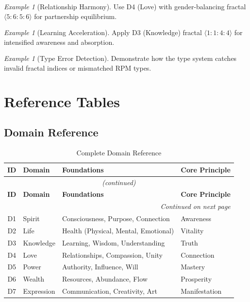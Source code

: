 \documentclass[11pt,twoside,openright]{book}
\theoremstyle{definition}
\theoremstyle{plain}
\theoremstyle{remark}
\newtheorem{example}[definition]{Example}
\begin{document}
\begin{example}[Relationship Harmony]
\label{ex:relationship}
Use D4 (Love) with gender-balancing fractal $\langle 5:6:5:6 \rangle$ for partnership equilibrium.
\end{example}

\begin{example}[Learning Acceleration]
\label{ex:learning}
Apply D3 (Knowledge) fractal $\langle 1:1:4:4 \rangle$ for intensified awareness and absorption.
\end{example}

\begin{example}[Type Error Detection]
\label{ex:type-error}
Demonstrate how the type system catches invalid fractal indices or mismatched RPM types.
\end{example}

\chapter{Reference Tables}
\label{ch:reference}

\section{Domain Reference}

\begin{center}
\begin{longtable}{clll}
\caption{Complete Domain Reference} \\
\toprule
\textbf{ID} & \textbf{Domain} & \textbf{Foundations} & \textbf{Core Principle} \\
\midrule
\endfirsthead
\multicolumn{4}{c}{\textit{(continued)}} \\
\toprule
\textbf{ID} & \textbf{Domain} & \textbf{Foundations} & \textbf{Core Principle} \\
\midrule
\endhead
\midrule
\multicolumn{4}{r}{\textit{Continued on next page}} \\
\endfoot
\bottomrule
\endlastfoot
D1 & Spirit & Consciousness, Purpose, Connection & Awareness \\
D2 & Life & Health (Physical, Mental, Emotional) & Vitality \\
D3 & Knowledge & Learning, Wisdom, Understanding & Truth \\
D4 & Love & Relationships, Compassion, Unity & Connection \\
D5 & Power & Authority, Influence, Will & Mastery \\
D6 & Wealth & Resources, Abundance, Flow & Prosperity \\
D7 & Expression & Communication, Creativity, Art & Manifestation \\
\end{longtable}
\end{center}
\end{document}
